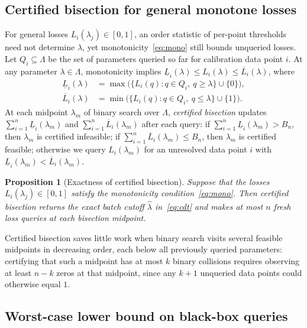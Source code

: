 \documentclass[a4paper,10pt]{article}
\theoremstyle{plain}
\newtheorem{proposition}[theorem]{Proposition}
\theoremstyle{remark}
\begin{document}
\subsection{Certified bisection for general monotone losses}\label{sec:certified}

For general losses $L_i(\lambda_j)\in[0,1]$, an order statistic of per-point thresholds need not determine $\widehat\lambda$, yet monotonicity~\eqref{eq:mono} still bounds unqueried losses. Let $Q_i\subseteq\Lambda$ be the set of parameters queried so far for calibration data point $i$. At any parameter $\lambda\in\Lambda$, monotonicity implies $\underline L_i(\lambda)\le L_i(\lambda)\le\overline L_i(\lambda)$, where
\begin{equation}\label{eq:bounds}
\begin{aligned}
 \underline L_i(\lambda)
 &=\max\bigl(\{L_i(q):q\in Q_i,\ q\ge\lambda\}\cup\{0\}\bigr),\\
 \overline L_i(\lambda)
 &=\min\bigl(\{L_i(q):q\in Q_i,\ q\le\lambda\}\cup\{1\}\bigr).
\end{aligned}
\end{equation}
At each midpoint $\lambda_m$ of binary search over $\Lambda$, \emph{certified bisection} updates $\sum_{i=1}^n \underline L_i(\lambda_m)$ and $\sum_{i=1}^n \overline L_i(\lambda_m)$ after each query: if $\sum_{i=1}^n \underline L_i(\lambda_m)>B_n$, then $\lambda_m$ is certified infeasible; if $\sum_{i=1}^n \overline L_i(\lambda_m)\le B_n$, then $\lambda_m$ is certified feasible; otherwise we query $L_i(\lambda_m)$ for an unresolved data point $i$ with $\underline L_i(\lambda_m)<\overline L_i(\lambda_m)$.

\begin{proposition}[Exactness of certified bisection]\label{prop:partial}
Suppose that the losses $L_i(\lambda_j)\in[0,1]$ satisfy the monotonicity condition~\eqref{eq:mono}. Then certified bisection returns the exact batch cutoff $\widehat\lambda$ in~\eqref{eq:cdt} and makes at most $n$ fresh loss queries at each bisection midpoint.
\end{proposition}

Certified bisection saves little work when binary search visits several feasible midpoints in decreasing order, each below all previously queried parameters: certifying that such a midpoint has at most $k$ binary collisions requires observing at least $n-k$ zeros at that midpoint, since any $k+1$ unqueried data points could otherwise equal $1$.

\subsection{Worst-case lower bound on black-box queries}\label{sec:lower}
\end{document}
